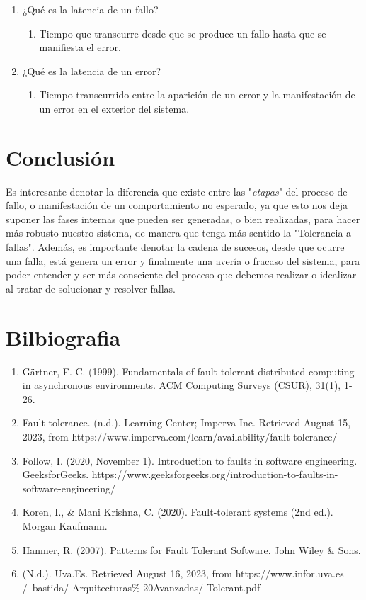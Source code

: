 \documentclass{dense_template}
\begin{document}
\begin{enumerate}
\begin{enumerate}
    \end{enumerate}
    \item ¿Qué es la latencia de un fallo?
    \begin{enumerate}
        \item Tiempo que transcurre desde que se produce un fallo hasta que se manifiesta el error.
    \end{enumerate}
    \item ¿Qué es la latencia de un error?
    \begin{enumerate}
        \item Tiempo transcurrido entre la aparición de un error y la manifestación de un error en el exterior del sistema.
    \end{enumerate}
\end{enumerate}
\pagebreak
\section{Conclusión}
Es interesante denotar la diferencia que existe entre las "\textit{etapas}"  del proceso de fallo, o manifestación de un comportamiento no esperado, ya que esto nos deja suponer las fases internas que pueden ser generadas, o bien realizadas, para hacer más robusto nuestro sistema, de manera que tenga más sentido la "Tolerancia a fallas". Además, es importante denotar la cadena de sucesos, desde que ocurre una falla, está genera un error y finalmente una avería o fracaso del sistema, para poder entender y ser más consciente del proceso que debemos realizar o idealizar al tratar de solucionar y resolver fallas. 
\pagebreak
\section{Bilbiografia}
\sloppy
\begin{enumerate}
    \item Gärtner, F. C. (1999). Fundamentals of fault-tolerant distributed computing in asynchronous environments. ACM Computing Surveys (CSUR), 31(1), 1-26.
    \item Fault tolerance. (n.d.). Learning Center; Imperva Inc. Retrieved August 15, 2023, from https://www.imperva.com/learn/availability/fault-tolerance/
    \item Follow, I. (2020, November 1). Introduction to faults in software engineering. GeeksforGeeks. https://www.geeksforgeeks.org/introduction-to-faults-in-software-engineering/
    \item Koren, I., \& Mani Krishna, C. (2020). Fault-tolerant systems (2nd ed.). Morgan Kaufmann.
    \item Hanmer, R. (2007). Patterns for Fault Tolerant Software. John Wiley \& Sons.
    \item (N.d.). Uva.Es. Retrieved August 16, 2023, from https://www.infor.uva.es /~bastida/ Arquitecturas\% 20Avanzadas/ Tolerant.pdf


\end{enumerate}
\end{document}
